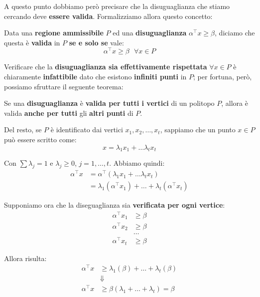 A questo punto dobbiamo però precisare che la disuguaglianza che stiamo cercando
deve \textbf{essere valida}. Formalizziamo allora questo concetto:

\begin{definition}
    Data una \textbf{regione ammissibile} $P$ ed una \textbf{disuguaglianza}
    $\alpha^\top x \ge \beta$, diciamo che questa è \textbf{valida} in $P$
    \textbf{se e solo se} vale:
    \[
        \alpha^\top x \ge \beta \text{ } \forall x \in P
    \] 
\end{definition}

Verificare che la \textbf{disuguaglianza sia effettivamente rispettata} $\forall x\in P$ è 
chiaramente \textbf{infattibile} dato che esistono \textbf{infiniti punti} in $P$; per 
fortuna, però, possiamo sfruttare il seguente teorema:

\begin{theorem}
    Se una \textbf{disuguaglianza} è \textbf{valida per tutti i vertici} di un politopo
    $P$, allora è valida \textbf{anche per tutti} gli 
    \textbf{altri punti} di $P$.
\end{theorem}

Del resto, se $P$ è identificato dai vertici $x_{1},x_{2},\ldots ,x_t$, sappiamo
che un punto $x\in P$ può essere scritto come:
\[
    x = \lambda_{1}x_{1} + \ldots \lambda_t x_t
\]

Con $\sum \lambda_j = 1$ e $\lambda_j\ge 0$, $j=1,\ldots ,t$. Abbiamo quindi:
\[
    \begin{aligned}
        \alpha^\top x &= \alpha^\top (\lambda_{1}x_{1} + \ldots \lambda_t x_t) \\ 
              &= \lambda_{1}(\alpha^\top x_{1}) + \ldots + \lambda_t(\alpha^\top x_t)
    \end{aligned}
\]

Supponiamo ora che la diseguaglianza sia \textbf{verificata per ogni vertice}:
\[
    \begin{aligned}
        \alpha^\top x_{1} &\ge \beta \\ 
        \alpha^\top x_{2} &\ge \beta \\ 
               &\ldots \\ 
        \alpha^\top x_t &\ge \beta
    \end{aligned}
\]

Allora risulta:
\[
    \begin{aligned}
        \alpha^\top x &\ge \lambda_{1}(\beta) + \ldots + \lambda_t(\beta) \\
                      &\Downarrow \\ 
        \alpha^\top x &\ge \beta(\lambda_{1}+\ldots +\lambda_t) = \beta 
    \end{aligned}
\]

